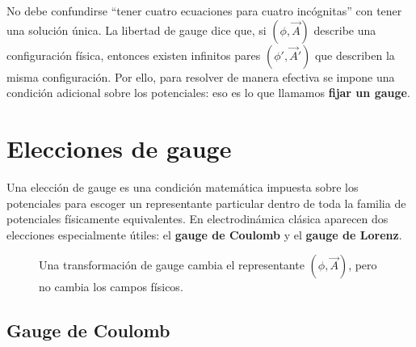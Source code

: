 \documentclass[../main.tex]{subfiles}
\begin{document}
\begin{cuidado}
No debe confundirse ``tener cuatro ecuaciones para cuatro incógnitas'' con tener una solución única. La libertad de gauge dice que, si $(\phi,\vec A)$ describe una configuración física, entonces existen infinitos pares $(\phi',\vec A')$ que describen la misma configuración. Por ello, para resolver de manera efectiva se impone una condición adicional sobre los potenciales: eso es lo que llamamos \textbf{fijar un gauge}.
\end{cuidado}

\section{Elecciones de gauge}

Una elección de gauge es una condición matemática impuesta sobre los potenciales para escoger un representante particular dentro de toda la familia de potenciales físicamente equivalentes. En electrodinámica clásica aparecen dos elecciones especialmente útiles: el \textbf{gauge de Coulomb} y el \textbf{gauge de Lorenz}.

\begin{figure}[ht!]
\centering
{}
\caption{Una transformación de gauge cambia el representante $(\phi,\vec A)$, pero no cambia los campos físicos.}
\label{fig:gauge-misma-fisica}
\end{figure}

\subsection*{Gauge de Coulomb}
\end{document}
